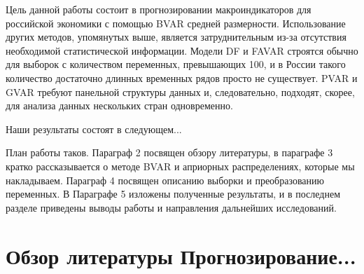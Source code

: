 \documentclass[11pt]{article} %
\begin{document}
Цель данной работы состоит в прогнозировании макроиндикаторов для российской экономики с помощью BVAR средней размерности. Использование других методов, упомянутых выше, является затруднительным из-за отсутствия необходимой статистической информации. Модели DF и FAVAR строятся обычно для выборок с количеством переменных, превышающих 100, и в России такого количество достаточно длинных временных рядов просто не существует. PVAR и GVAR требуют панельной структуры данных и, следовательно, подходят, скорее, для анализа данных нескольких стран одновременно. 

Наши результаты состоят в следующем... 


План работы таков. Параграф 2 посвящен обзору литературы, в параграфе 3 кратко рассказывается о методе BVAR и априорных распределениях, которые мы накладываем. Параграф 4 посвящен описанию выборки и преобразованию переменных. В Параграфе 5 изложены полученные результаты, и в последнем разделе приведены выводы работы и направления дальнейших исследований.

\section{Обзор литературы Прогнозирование...}
\end{document}
